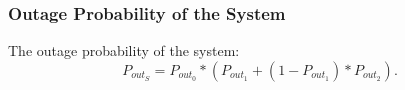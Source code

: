 \documentclass{beamer}
\begin{document}
\begin{frame}
\frametitle{Outage Probability of the System}
 The outage probability of the system:
\begin{equation}
P_{out_{S}} = P_{out_{0}}*(P_{out_{1}}+(1-P_{out_{1}})*P_{out_{2}}).
\end{equation}
\end{frame}
%
\end{document}
